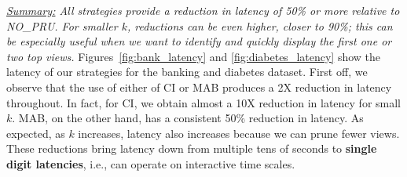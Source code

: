 {\em \underline{Summary:} All strategies provide a reduction in latency of 50\% or more
relative to NO\_PRU. For smaller $k$, reductions can be even higher, closer to 90\%; this can be
especially useful when we want to identify and quickly display the first one or two top views.}
Figures~\ref{fig:bank_latency} and \ref{fig:diabetes_latency} show the latency
of our strategies for the banking and diabetes dataset.
First off, we observe that the use of either of CI or MAB produces a 2X reduction in latency
throughout.
In fact, for CI, we obtain almost a 10X reduction in latency for small $k$. 
MAB, on the other hand, has a consistent 50\% reduction in latency. 
As expected, as $k$ increases, latency also increases because we can prune fewer views.
These reductions bring latency down from multiple tens of seconds to {\bf single digit latencies}, i.e.,
\SeeDB can operate on interactive time scales.



